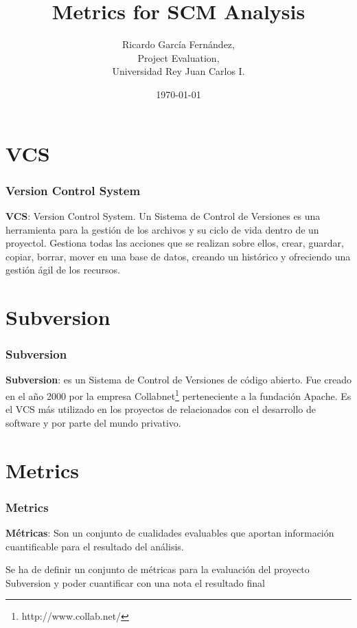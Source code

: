 \documentclass[xcolor=dvipsnames]{beamer}
\title{Metrics for SCM Analysis}
\author{Ricardo Garc\'ia Fern\'andez,\\
        Project Evaluation,\\
        Universidad Rey Juan Carlos I.}
\date{\today}
\begin{document}

\section[Index]{}
\begin{frame}[allowframebreaks]
\tableofcontents
\end{frame}

\section{VCS}
\begin{frame}[allowframebreaks]
\frametitle{Version Control System}

\textbf{VCS}: Version Control System. Un Sistema de Control de Versiones es una herramienta para la gesti\'on de los archivos y su ciclo de vida dentro de un proyectol. Gestiona todas las acciones que se realizan sobre ellos, crear, guardar, copiar, borrar, mover en una base de datos, creando un hist\'orico y ofreciendo una gesti\'on \'agil de los recursos.

\end{frame}

\section{Subversion}
\begin{frame}[allowframebreaks]
\frametitle{Subversion}
\textbf{Subversion}: es un Sistema de Control de Versiones de c\'odigo abierto.
Fue creado en el a\~no 2000 por la empresa Collabnet\footnote{http://www.collab.net/} perteneciente a la fundaci\'on Apache.
Es el VCS m\'as utilizado en los proyectos de relacionados con el desarrollo de software y por parte del mundo privativo.
\end{frame}

\section{Metrics}
\begin{frame}[allowframebreaks]
\frametitle{Metrics}
\textbf{M\'etricas}: Son un conjunto de cualidades evaluables que aportan informaci\'on cuantificable para el resultado del an\'alisis.

\par Se ha de definir un conjunto de m\'etricas para la evaluaci\'on del proyecto Subversion y poder cuantificar con una nota el resultado final
\end{frame}
\end{document}
